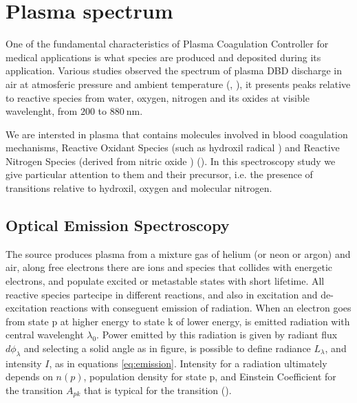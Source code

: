 \chapter{Plasma spectrum}
\label{ch:spectrometry}
One of the fundamental characteristics of Plasma Coagulation Controller for medical applications is what species are produced and deposited during its application. Various studies observed the spectrum of plasma DBD discharge in air at atmosferic pressure and ambient temperature (\cite{DBDair_Trot}, \cite{DBDAirTypicalSpec}), it presents peaks relative to reactive species from water, oxygen, nitrogen and its oxides at visible wavelenght, from $\num{200}$ to $\SI{880}{\nano\meter}$.

We are intersted in plasma that contains molecules involved in blood coagulation mechanisms, Reactive Oxidant Species (such as hydroxil radical ) and Reactive Nitrogen Species (derived from nitric oxide ) (\cite{6153386}). In this spectroscopy study we give particular attention to them and their precursor, i.e. the presence of transitions relative to hydroxil, oxygen and molecular nitrogen.


\section{Optical Emission Spectroscopy}
The source produces plasma from a mixture gas of helium (or neon or argon) and air, along free electrons there are ions and species that collides with energetic electrons, and populate excited or metastable states with short lifetime. All reactive species partecipe in different reactions, and also in excitation and de-excitation reactions with conseguent emission of radiation. When an electron goes from state p at higher energy to state k of lower energy, is emitted radiation with central wavelenght $\lambda_0$. Power emitted by this radiation is given by radiant flux $d\phi_{\lambda}$ and selecting a solid angle as in figure, is possible to define radiance $L_{\lambda}$, and intensity $I$, as in equations \ref{eq:emission}. Intensity for a radiation ultimately depends on $n(p)$, population density for state p, and Einstein Coefficient for the transition $A_{pk}$ that is typical for the transition (\cite{book:291477}).

